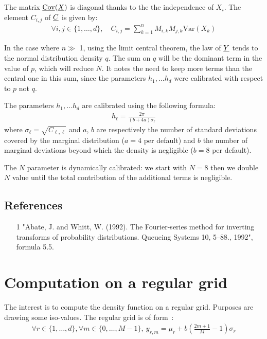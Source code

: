 The matrix ${\underline{\mathrm{Cov}}}({\underline{X}})$ is diagonal thanks to the the independence of $X_i$.
The element $C_{i,j}$ of ${\underline{C}}$ is given by:
\begin{align}
\forall i,j\in\{1,\hdots,d\},\quad C_{i,j}=\sum_{k=1}^nM_{i,k}M_{j,k}\mathrm{Var}(X_k)
\end{align}

In the case where $n \gg $ 1, using the limit central theorem, the law of ${\underline{Y}} $ tends to the normal distribution density $q$.
The sum on $q$ will be the dominant term in the value of $p$, which will reduce $N$.
It notes the need to keep more terms than the central one in this sum, since the parameters $ h_1, \dots  h_d$ were calibrated
with respect to $p$ not $q$.

The parameters $h_1, \dots  h_d$ are calibrated using the following formula:
\begin{align}
  h_\ell = \frac{2\pi}{(b+4a)\sigma_\ell}
\end{align}
where $\sigma_\ell=\sqrt{C_{\ell,\ell}}$ and $a$, $b$ are respectively the number of standard deviations covered by the marginal distribution
($a=4$ per default) and $b$ the number of marginal deviations beyond which the density is negligible ($b=​​8$ per default).

The $N$ parameter is dynamically calibrated: we start with $N=8$ then we double $N$ value until the total contribution of the additional terms is negligible.

\subsection{References}\label{ref}
\begin{itemize}
  \item[1] "Abate, J. and Whitt, W. (1992). The Fourier-series method for inverting transforms of probability distributions. Queueing Systems 10, 5--88., 1992",
        formula 5.5.
\end{itemize}

\section{Computation on a regular grid}
The interest is to compute the density function on a regular grid. Purposes are drawing some iso-values.
The regular grid is of form~:
\begin{align}
  \forall r\in\{1,\hdots,d\},\forall m\in\{0,\hdots,M-1\},\:y_{r,m}=\mu_r+b\left(\frac{2m+1}{M} - 1\right)\sigma_r
\end{align}

